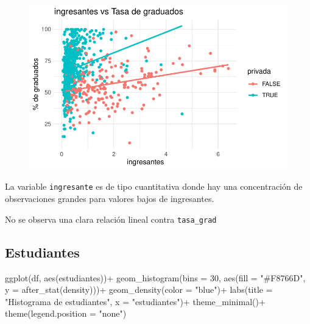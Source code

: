 \documentclass[
  letterpaper,
  DIV=11,
  numbers=noendperiod]{scrartcl}
\newenvironment{Shaded}{\begin{snugshade}}{\end{snugshade}}
\newcommand{\AttributeTok}[1]{\textcolor[rgb]{0.40,0.45,0.13}{#1}}
\newcommand{\DecValTok}[1]{\textcolor[rgb]{0.68,0.00,0.00}{#1}}
\newcommand{\FunctionTok}[1]{\textcolor[rgb]{0.28,0.35,0.67}{#1}}
\newcommand{\NormalTok}[1]{\textcolor[rgb]{0.00,0.23,0.31}{#1}}
\newcommand{\SpecialCharTok}[1]{\textcolor[rgb]{0.37,0.37,0.37}{#1}}
\newcommand{\StringTok}[1]{\textcolor[rgb]{0.13,0.47,0.30}{#1}}
\begin{document}
\begin{figure}[H]

{\centering \includegraphics{TP_final_files/figure-pdf/unnamed-chunk-12-1.pdf}

}

\end{figure}

La variable \texttt{ingresante} es de tipo cuantitativa donde hay una
concentración de observaciones grandes para valores bajos de
ingresantes.

No se observa una clara relación lineal contra \texttt{tasa\_grad}

\hypertarget{estudiantes}{%
\subsection{Estudiantes}\label{estudiantes}}

\begin{Shaded}
\begin{Highlighting}[]
\FunctionTok{ggplot}\NormalTok{(df, }\FunctionTok{aes}\NormalTok{(estudiantes))}\SpecialCharTok{+}
  \FunctionTok{geom\_histogram}\NormalTok{(}\AttributeTok{bins =} \DecValTok{30}\NormalTok{, }\FunctionTok{aes}\NormalTok{(}\AttributeTok{fill =} \StringTok{"\#F8766D"}\NormalTok{, }\AttributeTok{y =} \FunctionTok{after\_stat}\NormalTok{(density)))}\SpecialCharTok{+}
  \FunctionTok{geom\_density}\NormalTok{(}\AttributeTok{color =} \StringTok{"blue"}\NormalTok{)}\SpecialCharTok{+}
  \FunctionTok{labs}\NormalTok{(}\AttributeTok{title =} \StringTok{"Histograma de estudiantes"}\NormalTok{,}
       \AttributeTok{x =} \StringTok{"estudiantes"}\NormalTok{)}\SpecialCharTok{+}
  \FunctionTok{theme\_minimal}\NormalTok{()}\SpecialCharTok{+}
  \FunctionTok{theme}\NormalTok{(}\AttributeTok{legend.position =} \StringTok{"none"}\NormalTok{)}
\end{Highlighting}
\end{Shaded}
\end{document}
